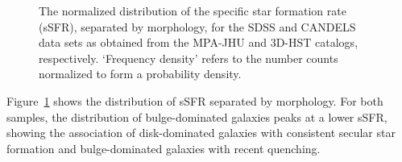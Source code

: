 \begin{figure}[htb]
	\begin{center}
  \end{center}
  \caption{The normalized distribution of the specific star formation rate\,(sSFR), separated by morphology, for the SDSS and CANDELS data sets as obtained from the MPA-JHU and 3D-HST catalogs, respectively. `Frequency density' refers to the number counts normalized to form a probability density.}
  \label{fig:ssfr_distr}
\end{figure}

Figure~\ref{fig:ssfr_distr} shows the distribution of sSFR separated by morphology. For both samples, the distribution of bulge-dominated galaxies peaks at a lower sSFR, showing the association of disk-dominated galaxies with consistent secular star formation and bulge-dominated galaxies with recent quenching. 

